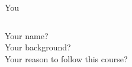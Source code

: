 \begin{frame}{You}
	\begin{columns}
		Your name?\\
		Your background?\\
		Your reason to follow this course?
	\end{columns}
\end{frame}


